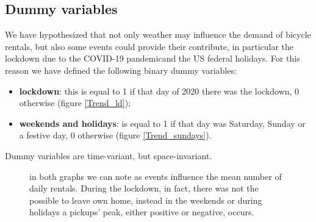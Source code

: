\subsection{Dummy variables}
We have hypothesized that not only weather may influence the demand of bicycle rentals, but also some events could provide their contribute, in particular the lockdown due to the COVID-\num{19} pandemicand the US federal holidays. For this reason we have defined the following binary dummy variables:
\begin{itemize}
	\item \textbf{lockdown}: this is equal to \num{1} if that day of \num{2020} there was the lockdown, \num{0} otherwise (figure \ref{Trend_ld});
	\item \textbf{weekends and holidays}: is equal to \num{1} if that day was Saturday, Sunday or a festive day, \num{0} otherwise (figure \ref{Trend_sundays}).
\end{itemize}
Dummy variables are time-variant, but space-invariant.

\begin{figure}[h!]
	\centering
	\centering
	\quad
	\quad
	\caption{in both graphs we can note as events influence the mean number of daily rentals. During the lockdown, in fact, there was not the possible to leave own home, instead in the weekends or during holidays a pickups' peak, either positive or negative, occurs.}
\end{figure}
